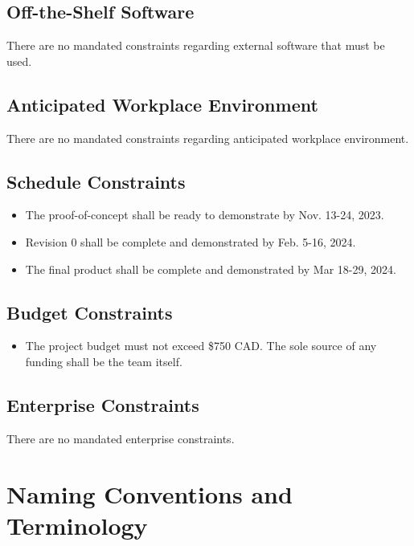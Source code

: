 \documentclass[12pt]{article}
\begin{document}
\subsection{Off-the-Shelf Software}
There are no mandated constraints regarding external software that must be used.
\subsection{Anticipated Workplace Environment}
There are no mandated constraints regarding anticipated workplace environment.
\subsection{Schedule Constraints}
\begin{itemize}
  \item The proof-of-concept shall be ready to demonstrate by Nov. 13-24, 2023.
  \item Revision 0 shall be complete and demonstrated by Feb. 5-16, 2024.
  \item The final product shall be complete and demonstrated by Mar 18-29, 2024.
\end{itemize}
\subsection{Budget Constraints}
\begin{itemize}
  \item The project budget must not exceed \$750 CAD. The sole source of any funding shall be the team itself. 
\end{itemize}
\subsection{Enterprise Constraints}
There are no mandated enterprise constraints.
\section{Naming Conventions and Terminology}
\end{document}
